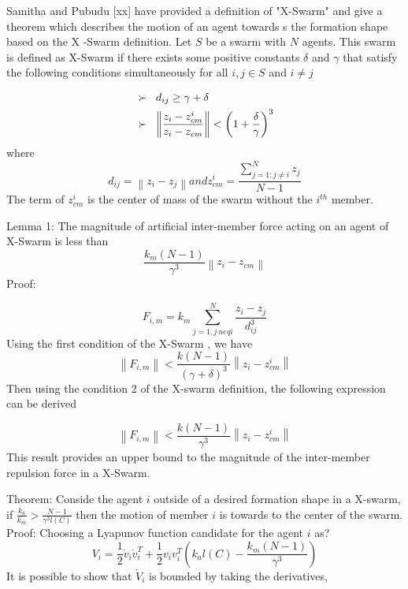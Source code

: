 \documentclass[twoside]{article}
\newcommand{\norm}[1]{\left\lVert#1\right\rVert}
\begin{document}
			
			Samitha and Pubudu [xx] have provided a definition of "X-Swarm" and give a theorem which describes the motion of an agent towards s the formation shape based on the X -Swarm definition. Let $S$ be a swarm with $N$ agents. This swarm is defined as X-Swarm if there exists some positive constants $\delta$ and  $ \gamma$ that satisfy the following conditions simultaneously for all $i,j \in S$ and $i \neq j$
			
\begin{align*}
&\succ\hspace{0.2cm}  d_{ij} \geq \gamma + \delta \\
&\succ \hspace{0.2cm}   \norm{\frac{z_i - z_{cm}^i}{z_i - z_{cm}}} < \left(1+\frac{\delta}{\gamma}\right)^3
\end{align*}
			where
\begin{equation}
 d_{ij} = \norm{z_i - z_j} and z_{cm}^i = \frac{\sum_{j=1; j\neq i}^{N} z_j}{N-1}
\end{equation}
The term of $z_{cm}^i$ is the center of mass of the swarm without the $i^{th}$ member.

Lemma 1: The magnitude of artificial inter-member force acting on an agent of X-Swarm  is less than
\begin{equation}
 \frac{k_m(N-1)}{\gamma ^3} \norm{z_i - z_{cm}}
\end{equation}
Proof:

\begin{equation}
 F_{i,m} = k_m \sum_{j=1, j\ neq i}^{N} \frac{z_i - z_j}{d_{ij}^3} 
\end{equation}
Using the first condition of the X-Swarm , we have
\begin{equation}
 \norm{F_{i,m}} < \frac{k(N-1)}{(\gamma + \delta)^3} \norm{z_i - z_{cm}^i}
\end{equation}
Then using the condition 2 of the X-swarm definition, the following expression can be derived

\begin{equation}
 \norm{F_{i,m}} < \frac{k(N-1)}{\gamma^3} \norm{z_i - z_{cm}^i}
\end{equation}
		This result provides an upper bound to the magnitude of the inter-member repulsion force in a X-Swarm.  
		
		Theorem: Conside the agent $i$	outside of a desired formation shape in a X-swarm, if $\frac{k_a}{k_m} > \frac{N-1}{\gamma^3  l(C)}$ then the motion of member $i$ is towards to the center of the swarm. 
		Proof: Choosing a Lyapunov function candidate for the agent $i$ as?
		\begin{equation}
      V_i = \frac{1}{2} \dot{v}_i \dot{v}_i^T + \frac{1}{2} v_i v_i^T\left(k_al(C)-\frac{k_m(N-1)}{\gamma^3}\right) 
      		\end{equation}
			It is possible to show that $\dot{V}_i$ is bounded by taking the derivatives,
			
\end{document}
